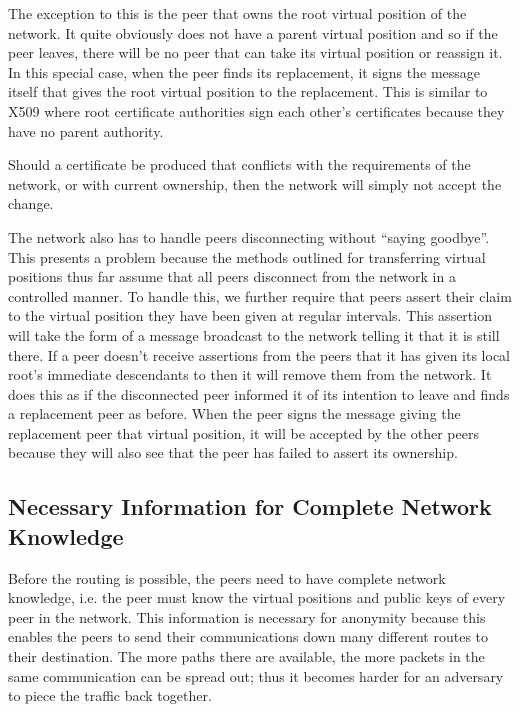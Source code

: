 \documentclass[ %
                    author={Luke Murray},
                supervisor={Dr. Simon Hollis},
                     title={Shadow Peer-to-Peer Networks},
                  subtitle={},
                    degree={MEng},
                      year={2013} ]{thesis}
\begin{document}
The exception to this is the peer that owns the root virtual position of the network. It quite obviously does not have a parent virtual position and so if the peer leaves, there will be no peer that can take its virtual position or reassign it. In this special case, when the peer finds its replacement, it signs the message itself that gives the root virtual position to the replacement. This is similar to X509 where root certificate authorities sign each other's certificates because they have no parent authority.

Should a certificate be produced that conflicts with the requirements of the network, or with current ownership, then the network will simply not accept the change.

The network also has to handle peers disconnecting without ``saying goodbye''. This presents a problem because the methods outlined for transferring virtual positions thus far assume that all peers disconnect from the network in a controlled manner. To handle this, we further require that peers assert their claim to the virtual position they have been given at regular intervals. This assertion will take the form of a message broadcast to the network telling it that it is still there. If a peer doesn't receive assertions from the peers that it has given its local root's immediate descendants to then it will remove them from the network. It does this as if the disconnected peer informed it of its intention to leave and finds a replacement peer as before. When the peer signs the message giving the replacement peer that virtual position, it will be accepted by the other peers because they will also see that the peer has failed to assert its ownership.

\subsection{Necessary Information for Complete Network Knowledge}

Before the routing is possible, the peers need to have complete network knowledge, i.e. the peer must know the virtual positions and public keys of every peer in the network. This information is necessary for anonymity because this enables the peers to send their communications down many different routes to their destination. The more paths there are available, the more packets in the same communication can be spread out; thus it becomes harder for an adversary to piece the traffic back together.
\end{document}
